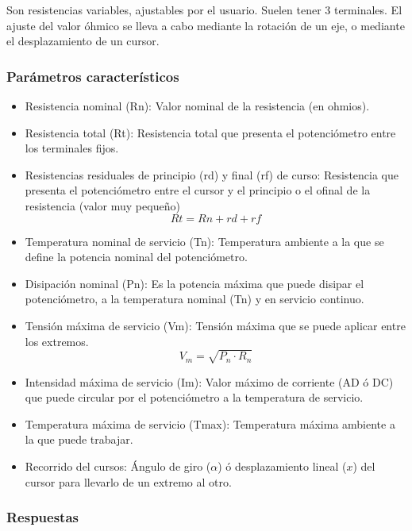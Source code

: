 Son resistencias variables, ajustables por el usuario. Suelen tener 3 terminales. El ajuste del valor óhmico se lleva a cabo mediante la rotación de un eje, o mediante el desplazamiento de un cursor.

\subsubsection{Parámetros característicos}
\begin{itemize}
    \item Resistencia nominal (Rn): Valor nominal de la resistencia (en ohmios).
    \item Resistencia total (Rt): Resistencia total que presenta el potenciómetro entre los terminales fijos.
    \item Resistencias residuales de principio (rd) y final (rf) de curso: Resistencia que presenta el potenciómetro entre el cursor y el principio o el ofinal de la resistencia (valor muy pequeño)
    \begin{equation}
        Rt = Rn + rd + rf
    \end{equation}
    \item Temperatura nominal de servicio (Tn): Temperatura ambiente a la que se define la potencia nominal del potenciómetro.
    \item Disipación nominal (Pn): Es la potencia máxima que puede disipar el potenciómetro, a la temperatura nominal (Tn) y en servicio continuo.
    \item Tensión máxima de servicio (Vm): Tensión máxima que se puede aplicar entre los extremos.
    \begin{equation}
        V_m = \sqrt{P_n \cdot R_n}
    \end{equation}
    \item Intensidad máxima de servicio (Im): Valor máximo de corriente (AD ó DC) que puede circular por el potenciómetro a la temperatura de servicio.
    \item Temperatura máxima de servicio (Tmax): Temperatura máxima ambiente a la que puede trabajar.
    \item Recorrido del cursos: Ángulo de giro ($\alpha$) ó desplazamiento lineal ($x$) del cursor para llevarlo de un extremo al otro.
\end{itemize}

\subsubsection{Respuestas}

